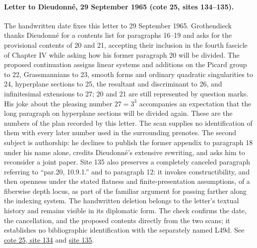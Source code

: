 \documentclass[10pt,a4paper]{article}
\begin{document}
\paragraph{Letter to Dieudonné, 29 September 1965 (cote 25, sites 134--135).}
The handwritten date fixes this letter to 29 September 1965. Grothendieck thanks Dieudonné for a contents list for paragraphs 16--19 and asks for the provisional contents of 20 and 21, accepting their inclusion in the fourth fascicle of Chapter IV while asking how his former paragraph 20 will be divided. The proposed continuation assigns linear systems and additions on the Picard group to 22, Grassmannians to 23, smooth forms and ordinary quadratic singularities to 24, hyperplane sections to 25, the resultant and discriminant to 26, and infinitesimal extensions to 27; 20 and 21 are still represented by question marks. His joke about the pleasing number $27=3^3$ accompanies an expectation that the long paragraph on hyperplane sections will be divided again. These are the numbers of the plan recorded by this letter. The scan supplies no identification of them with every later number used in the surrounding prenotes. The second subject is authorship: he declines to publish the former appendix to paragraph 18 under his name alone, credits Dieudonné's extensive rewriting, and asks him to reconsider a joint paper. Site 135 also preserves a completely canceled paragraph referring to ``par.20, 10.9.1.'' and to paragraph 12: it invokes constructibility, and then openness under the stated flatness and finite-presentation assumptions, of a fiberwise depth locus, as part of the familiar argument for passing farther along the indexing system. The handwritten deletion belongs to the letter's textual history and remains visible in its diplomatic form. The check confirms the date, the cancellation, and the proposed contents directly from the two scans; it establishes no bibliographic identification with the separately named L49d. See \href{https://grothendieck.umontpellier.fr/web/viewer.html?file=../25.pdf#page=135}{cote 25, site 134} and \href{https://grothendieck.umontpellier.fr/web/viewer.html?file=../25.pdf#page=136}{site 135}.
\par{}

\par{}
\end{document}
